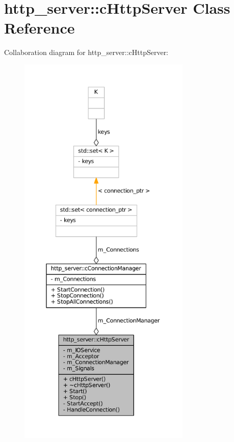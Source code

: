 \hypertarget{classhttp__server_1_1cHttpServer}{
\section{http\-\_\-server\-:\-:c\-Http\-Server \-Class \-Reference}
\label{classhttp__server_1_1cHttpServer}
}


\-Collaboration diagram for http\-\_\-server\-:\-:c\-Http\-Server\-:
\nopagebreak
\begin{figure}[H]
\begin{center}
\leavevmode
\includegraphics[height=550pt]{classhttp__server_1_1cHttpServer__coll__graph}
\end{center}
\end{figure}

